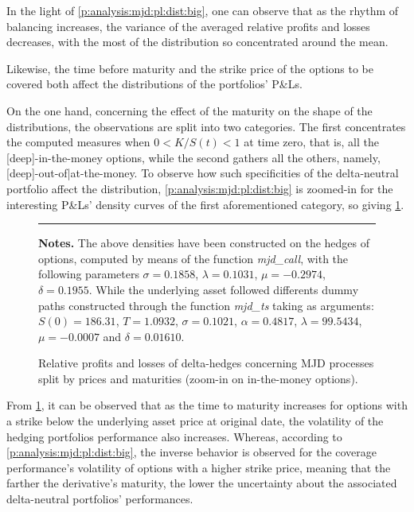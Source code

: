 \documentclass[12pt]{report}
\begin{document}
In the light of \cref{p:analysis:mjd:pl:dist:big}, one can observe that as the rhythm of balancing increases, the variance of the averaged relative profits and losses decreases, with the most of the distribution so concentrated around the mean.

Likewise,  the time before maturity and the strike price of the options to be covered both affect the distributions of the portfolios' P\&Ls.
%

On the one hand, concerning the effect of the maturity on the shape of the distributions, the observations are split into two categories.
The first concentrates the computed measures when $0 < K/S(t) < 1$ at time zero, that is, all the [deep]-in-the-money options, while the second gathers all the others, namely, [deep]-out-of|at-the-money. 
To observe how such specificities of the delta-neutral portfolio affect the distribution, \cref{p:analysis:mjd:pl:dist:big} is zoomed-in for the interesting P\&Ls' density curves of the first aforementioned category, so giving \cref{p:analysis:mjd:pl:dist:in}.


\begin{figure}[h]
  \centering
  \rule{40mm}{20mm}
  \caption{Relative profits and losses of delta-hedges concerning MJD processes split by prices and maturities (zoom-in on in-the-money options).}
  \begin{changemargin}{0.5cm}{0.5cm}
  \medskip
\footnotesize
{}\textbf{Notes.} The above densities have been constructed on the hedges of options, computed by means of the function \textit{mjd\_call}, with the following parameters $\sigma = 0.1858$, $\lambda = 0.1031$, $\mu = -0.2974$, $\delta = 0.1955$. While the underlying asset followed differents dummy paths constructed through the function \textit{mjd\_ts} taking as arguments: $S(0) = 186.31$, $T = 1.0932$, $\sigma = 0.1021$, $\alpha = 0.4817$, $\lambda = 99.5434$, $\mu = -0.0007$ and $\delta = 0.01610$. 
  \end{changemargin}
  \label{p:analysis:mjd:pl:dist:in}
\end{figure}

From \cref{p:analysis:mjd:pl:dist:in}, it can be observed that as the time to maturity increases for options with a strike below the underlying asset price at original date, the volatility of the hedging portfolios performance also increases.
Whereas, according to \cref{p:analysis:mjd:pl:dist:big}, the inverse behavior is observed for the coverage performance's volatility of options with a higher strike price, meaning that the farther the derivative's maturity, the lower the uncertainty about the associated delta-neutral portfolios' performances.
\end{document}
